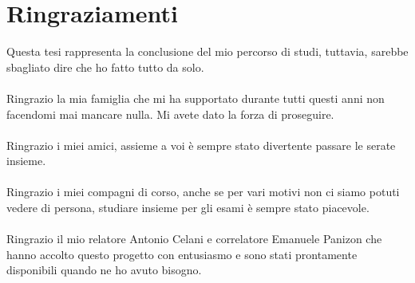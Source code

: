 \chapter*{Ringraziamenti}

Questa tesi rappresenta la conclusione del mio percorso di studi, tuttavia, sarebbe sbagliato dire che ho fatto tutto da solo.\\\\
Ringrazio la mia famiglia che mi ha supportato durante tutti questi anni non facendomi mai mancare nulla. Mi avete dato la forza di proseguire.\\\\
Ringrazio i miei amici, assieme a voi è sempre stato divertente passare le serate insieme.\\\\
Ringrazio i miei compagni di corso, anche se per vari motivi non ci siamo potuti vedere di persona, studiare insieme per gli esami è sempre stato piacevole.\\\\
Ringrazio il mio relatore Antonio Celani e correlatore Emanuele Panizon che hanno accolto questo progetto con entusiasmo e sono stati prontamente disponibili quando ne ho avuto bisogno.\\
